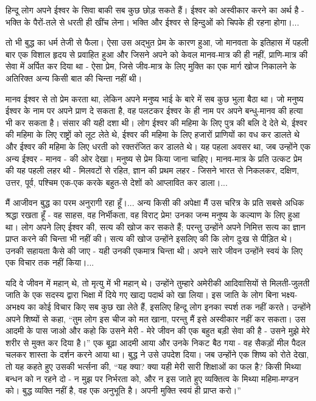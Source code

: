 हिन्दू लोग अपने ईश्वर के सिवा बाकी सब कुछ छोड़ सकते हैं। ईश्वर को अस्वीकार करने का अर्थ है - भक्ति के पैरों-तले से धरती ही खींच लेना। भक्ति और ईश्वर से हिन्दुओं को चिपके ही रहना होगा।... 

तो भी बुद्ध का धर्म तेजी से फैला। ऐसा उस अद्भुत प्रेम के कारण हुआ, जो मानवता के इतिहास में पहली बार एक विशाल हृदय से प्रवाहित हुआ और जिसने अपने को केवल मानव-मात्र की ही नहीं, प्राणि-मात्र की सेवा में अर्पित कर दिया था - ऐसा प्रेम, जिसे जीव-मात्र के लिए मुक्ति का एक मार्ग खोज निकालने के अतिरिक्त अन्य किसी बात की चिन्ता नहीं थी। 

मानव ईश्वर से तो प्रेम करता था, लेकिन अपने मनुष्य भाई के बारे में सब कुछ भुला बैठा था। जो मनुष्य ईश्वर के नाम पर अपने प्राण दे सकता है, वह पलटकर ईश्वर के ही नाम पर अपने बन्धु-मानव की हत्या भी कर सकता है। संसार की यही दशा थी। लोग ईश्वर की महिमा के लिए पुत्र की बलि दे देते थे, ईश्वर की महिमा के लिए राष्ट्रों को लूट लेते थे, ईश्वर की महिमा के लिए हजारों प्राणियों का वध कर डालते थे और ईश्वर की महिमा के लिए धरती को रक्तरंजित कर डालते थे। यह पहला अवसर था, जब उन्होंने एक अन्य ईश्वर - मानव - की ओर देखा। मनुष्य से प्रेम किया जाना चाहिए। मानव-मात्र के प्रति उत्कट प्रेम की यह पहली लहर थी - मिलवटों से रहित, ज्ञान की प्रथम लहर - जिसने भारत से निकलकर, दक्षिण, उत्तर, पूर्व, पश्चिम एक-एक करके बहुत-से देशों को आप्लावित कर डाला।... 

मैं आजीवन बुद्ध का परम अनुरागी रहा हूँ।... अन्य किसी की अपेक्षा मैं उस चरित्र के प्रति सबसे अधिक श्रद्धा रखता हूँ - वह साहस, वह निर्भीकता, वह विराट् प्रेम! उनका जन्म मनुष्य के कल्याण के लिए हुआ था। लोग अपने लिए ईश्वर की, सत्य की खोज कर सकते हैं; परन्तु उन्होंने अपने निमित्त सत्य का ज्ञान प्राप्त करने की चिन्ता भी नहीं की। सत्य की खोज उन्होंने इसलिए की कि लोग दुःख से पीड़ित थे। उनकी सहायता कैसे की जाए - यही उनकी एकमात्र चिन्ता थी। अपने सारे जीवन उन्होंने स्वयं के लिए एक विचार तक नहीं किया।... 

यदि वे जीवन में महान् थे, तो मृत्यु में भी महान् थे। उन्होंने तुम्हारे अमेरीकी आदिवासियों से मिलती-जुलती जाति के एक सदस्य द्वारा भिक्षा में दिये गए खाद्य पदार्थ को खा लिया। इस जाति के लोग बिना भक्ष्य-अभक्ष्य का कोई विचार किए सब कुछ खा लेते हैं, इसलिए हिन्दू लोग इनका स्पर्श तक नहीं करते। उन्होंने अपने शिष्यों से कहा, “तुम लोग इस चीज को मत खाना, परन्तु मैं इसे अस्वीकार नहीं कर सकता। उस आदमी के पास जाओ और कहो कि उसने मेरी - मेरे जीवन की एक बहुत बड़ी सेवा की है - उसने मुझे मेरे शरीर से मुक्त कर दिया है।” एक बूढ़ा आदमी आया और उनके निकट बैठ गया - वह सैकड़ों मील पैदल चलकर शास्ता के दर्शन करने आया था। बुद्ध ने उसे उपदेश दिया। जब उन्होंने एक शिष्य को रोते देखा, तो यह कहते हुए उसकी भर्त्सना की, “यह क्या? क्या यही मेरी सारी शिक्षाओं का फल है? किसी मिथ्या बन्धन को न रहने दो - न मुझ पर निर्भरता को, और न इस जाते हुए व्यक्तित्व के मिथ्या महिमा-मण्डन को। बुद्ध व्यक्ति नहीं है, वह एक अनुभूति है। अपनी मुक्ति स्वयं ही प्राप्त करो।” 

